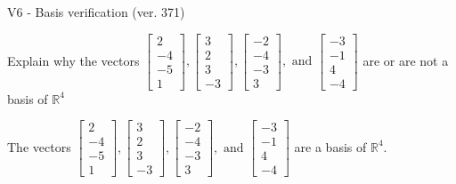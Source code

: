 \begin{exercise}
  \begin{exerciseTitle}V6 - Basis verification (ver. 371)\end{exerciseTitle}
  \begin{exerciseStatement}
    Explain why the vectors \(\left[\begin{array}{r}
2 \\
-4 \\
-5 \\
1
\end{array}\right] , \left[\begin{array}{r}
3 \\
2 \\
3 \\
-3
\end{array}\right] , \left[\begin{array}{r}
-2 \\
-4 \\
-3 \\
3
\end{array}\right] , \text{ and } \left[\begin{array}{r}
-3 \\
-1 \\
4 \\
-4
\end{array}\right]\) are or are not a basis of \(\mathbb{R}^4\)	


  \end{exerciseStatement}
  \begin{exerciseAnswer}
   The vectors \(\left[\begin{array}{r}
2 \\
-4 \\
-5 \\
1
\end{array}\right] , \left[\begin{array}{r}
3 \\
2 \\
3 \\
-3
\end{array}\right] , \left[\begin{array}{r}
-2 \\
-4 \\
-3 \\
3
\end{array}\right] , \text{ and } \left[\begin{array}{r}
-3 \\
-1 \\
4 \\
-4
\end{array}\right]\) 
  	 are  a basis of \(\mathbb{R}^4\).
  


  \end{exerciseAnswer}
\end{exercise}